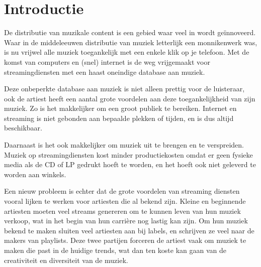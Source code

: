 \section{Introductie}

De distributie van muzikale content is een gebied waar veel in wordt geïnnoveerd. Waar in de middeleeuwen distributie van muziek letterlijk een monnikenwerk was, is nu vrijwel alle muziek toegankelijk met een enkele klik op je telefoon. Met de komst van computers en (snel) internet is de weg vrijgemaakt voor streamingdiensten met een haast oneindige database aan muziek.

Deze onbeperkte database aan muziek is niet alleen prettig voor de luisteraar, ook de artiest heeft een aantal grote voordelen aan deze toegankelijkheid van zijn muziek. Zo is het makkelijker om een groot publiek te bereiken. Internet en streaming is niet gebonden aan bepaalde plekken of tijden, en is dus altijd beschikbaar.

Daarnaast is het ook makkelijker om muziek uit te brengen en te verspreiden. Muziek op streamingdiensten kost minder productiekosten omdat er geen fysieke media als de CD of LP gedrukt hoeft te worden, en het hoeft ook niet geleverd te worden aan winkels.

Een nieuw probleem is echter dat de grote voordelen van streaming diensten vooral lijken te werken voor artiesten die al bekend zijn. Kleine en beginnende artiesten moeten veel streams genereren om te kunnen leven van hun muziek verkoop, wat in het begin van hun carrière nog lastig kan zijn. Om hun muziek bekend te maken sluiten veel artiesten aan bij labels, en schrijven ze veel naar de makers van playlists. Deze twee partijen forceren de artiest vaak om muziek te maken die past in de huidige trends, wat dan ten koste kan gaan van de creativiteit en diversiteit van de muziek.

